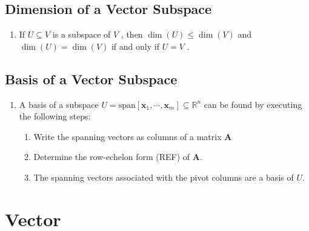 \subsection{Dimension of a Vector Subspace}

\begin{enumerate}
    \item If $U \subseteq V$ is a subspace of $V$ , then $\dim(U) \leq \dim(V )$ and $\dim(U) = \dim(V )$ if and only if $U = V$ .
    \hfill \cite{mfml/book/mml/Deisenroth-Faisal-Ong}
\end{enumerate}



\subsection{Basis of a Vector Subspace}

\begin{enumerate}
    \item A basis of a subspace $U = \text{span}[\bm{x}_1, \cdots , \bm{x}_m] \subseteq \mathbb{R}^n$ can be found by executing the following steps:
    \hfill \cite{mfml/book/mml/Deisenroth-Faisal-Ong}
    \begin{enumerate}
        \item Write the spanning vectors as columns of a matrix $\bm{A}$
        \hfill \cite{mfml/book/mml/Deisenroth-Faisal-Ong}

        \item Determine the row-echelon form (REF) of $\bm{A}$.
        \hfill \cite{mfml/book/mml/Deisenroth-Faisal-Ong}

        \item The spanning vectors associated with the pivot columns are a basis of $U$.
        \hfill \cite{mfml/book/mml/Deisenroth-Faisal-Ong}
    \end{enumerate}
\end{enumerate}
























\section{Vector}

